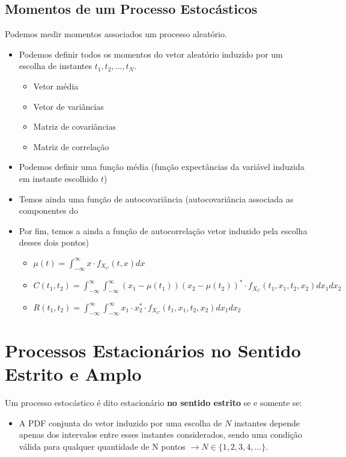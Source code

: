 \documentclass{article}
\begin{document}
\subsection{Momentos de um Processo Estocásticos}
Podemos medir momentos associados um processo aleatório.
\begin{itemize}
    \item Podemos definir todos os momentos do vetor aleatório induzido por um escolha de instantes
        $t_1,t_2,\ldots,t_N$.
        \begin{itemize}
            \item Vetor média
            \item Vetor de variâncias
            \item Matriz de covariâncias
            \item Matriz de correlação
        \end{itemize}
    \item Podemos definir uma função média (função expectâncias da variável induzida em instante
        escolhido $t$)
    \item Temos ainda uma função de autocovariância (autocovariância associada as componentes do
    \item Por fim, temos a ainda a função de autocorrelação
        vetor induzido pela escolha desses dois pontos)
        \begin{itemize}
            \item $\mu(t) = \int_{-\infty}^{\infty} x \cdot f_{X_C}(t,x)dx $
            \item $C(t_1, t_2) = \int_{-\infty}^{\infty}\int_{-\infty}^{\infty}
                (x_1-\mu(t_1))(x_2-\mu(t_2))^* \cdot f_{X_C}(t_1,x_1,t_2,x_2) dx_1 dx_2$
            \item $R(t_1, t_2) = \int_{-\infty}^{\infty}\int_{-\infty}^{\infty} x_1 \cdot x_2^* \cdot f_{X_C}(t_1,x_1,t_2,x_2) dx_1 dx_2$
        \end{itemize}
\end{itemize}

\newpage
\section{Processos Estacionários no Sentido Estrito e Amplo}
Um processo estocástico é dito estacionário \textbf{no sentido estrito} se e somente se:
\begin{itemize}
    \item A PDF conjunta do vetor induzido por uma escolha de $N$ instantes depende apenas dos
        intervalos entre esses instantes considerados, sendo uma condição válida para qualquer
        quantidade de N pontos $\to N \in \{1,2,3,4, \ldots \}$.
\end{itemize}
\end{document}
